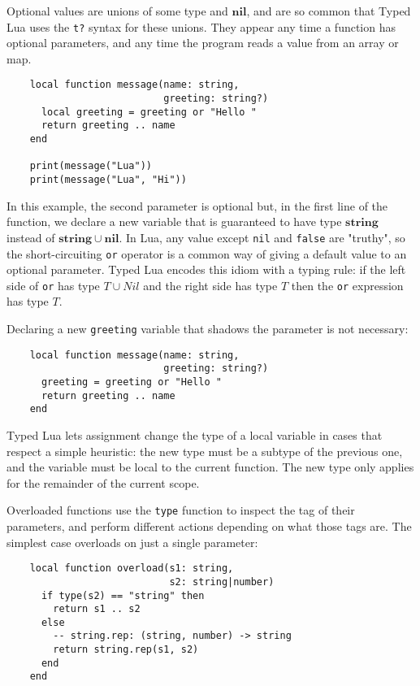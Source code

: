 \documentclass[preprint]{sig-alternate}
\newcommand{\Nil}{\mathbf{nil}}
\newcommand{\String}{\mathbf{string}}
\begin{document}
Optional values are unions of some type and $\Nil$, and are so
common that Typed Lua uses the {\tt t?} syntax for these unions.
They appear any time a function has optional parameters, and
any time the program reads a value from an array or map.

\begin{verbatim}
    local function message(name: string,
                           greeting: string?)
      local greeting = greeting or "Hello "
      return greeting .. name
    end
    
    print(message("Lua"))
    print(message("Lua", "Hi"))
\end{verbatim}

In this example, the second parameter is optional but, in the first
line of the function, we declare a new variable that is guaranteed to
have type $\String$ instead of $\String \cup \Nil$. In Lua, any value
except {\tt nil} and {\tt false} are "truthy", so the short-circuiting
{\tt or} operator is a common way of giving a default value to an
optional parameter. Typed Lua encodes this idiom with a typing rule: if
the left side of {\tt or} has type $T \cup Nil$ and the right side
has type $T$ then the {\tt or} expression has type $T$.

Declaring a new {\tt greeting} variable that shadows the parameter
is not necessary:

\begin{verbatim}
    local function message(name: string, 
                           greeting: string?)
      greeting = greeting or "Hello "
      return greeting .. name
    end
\end{verbatim}

Typed Lua lets assignment change the type of a local variable in
cases that respect a simple heuristic: the new type must be a
subtype of the previous one, and the variable must be local
to the current function. The new type only applies for the
remainder of the current scope.

Overloaded functions use the {\tt type} function to inspect
the tag of their parameters, and perform different actions
depending on what those tags are. The simplest case overloads
on just a single parameter:

\begin{verbatim}
    local function overload(s1: string, 
                            s2: string|number)
      if type(s2) == "string" then
        return s1 .. s2
      else
        -- string.rep: (string, number) -> string
        return string.rep(s1, s2)
      end
    end
\end{verbatim}
\end{document}
